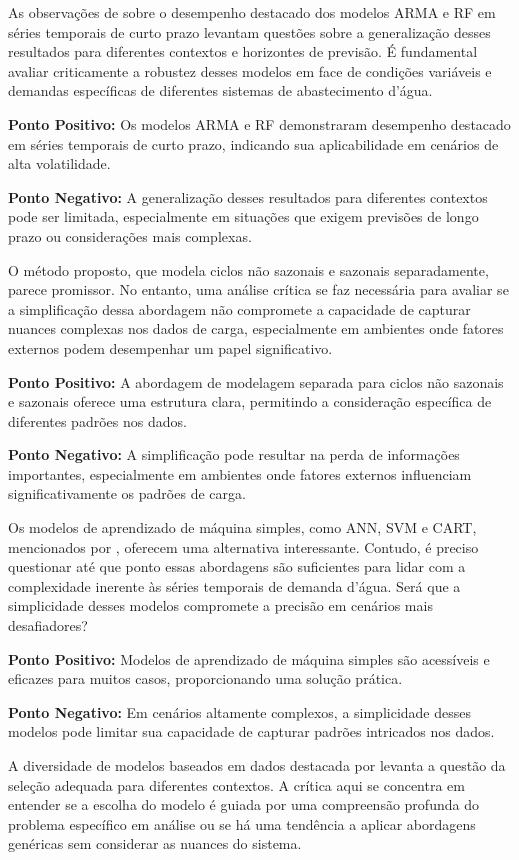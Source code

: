 As observações de  sobre o desempenho destacado dos modelos ARMA e RF em séries temporais de curto prazo levantam questões sobre a generalização desses resultados para diferentes contextos e horizontes de previsão. É fundamental avaliar criticamente a robustez desses modelos em face de condições variáveis e demandas específicas de diferentes sistemas de abastecimento d'água.

\textbf{Ponto Positivo:} Os modelos ARMA e RF demonstraram desempenho destacado em séries temporais de curto prazo, indicando sua aplicabilidade em cenários de alta volatilidade.

\textbf{Ponto Negativo:} A generalização desses resultados para diferentes contextos pode ser limitada, especialmente em situações que exigem previsões de longo prazo ou considerações mais complexas.

O método proposto, que modela ciclos não sazonais e sazonais separadamente, parece promissor. No entanto, uma análise crítica se faz necessária para avaliar se a simplificação dessa abordagem não compromete a capacidade de capturar nuances complexas nos dados de carga, especialmente em ambientes onde fatores externos podem desempenhar um papel significativo.

\textbf{Ponto Positivo:} A abordagem de modelagem separada para ciclos não sazonais e sazonais oferece uma estrutura clara, permitindo a consideração específica de diferentes padrões nos dados.

\textbf{Ponto Negativo:} A simplificação pode resultar na perda de informações importantes, especialmente em ambientes onde fatores externos influenciam significativamente os padrões de carga.

Os modelos de aprendizado de máquina simples, como ANN, SVM e CART, mencionados por , oferecem uma alternativa interessante. Contudo, é preciso questionar até que ponto essas abordagens são suficientes para lidar com a complexidade inerente às séries temporais de demanda d'água. Será que a simplicidade desses modelos compromete a precisão em cenários mais desafiadores?

\textbf{Ponto Positivo:} Modelos de aprendizado de máquina simples são acessíveis e eficazes para muitos casos, proporcionando uma solução prática.

\textbf{Ponto Negativo:} Em cenários altamente complexos, a simplicidade desses modelos pode limitar sua capacidade de capturar padrões intricados nos dados.

A diversidade de modelos baseados em dados destacada por  levanta a questão da seleção adequada para diferentes contextos. A crítica aqui se concentra em entender se a escolha do modelo é guiada por uma compreensão profunda do problema específico em análise ou se há uma tendência a aplicar abordagens genéricas sem considerar as nuances do sistema.

